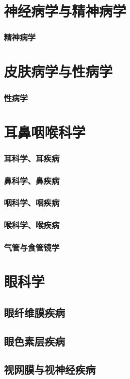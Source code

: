 \documentclass[UTF8]{../ApplicationUniverse}
\begin{document}
\section{神经病学与精神病学}
    \subsubsection{精神病学}
\section{皮肤病学与性病学}
    \subsubsection{性病学}
\section{耳鼻咽喉科学}
    \subsubsection{耳科学、耳疾病}
    \subsubsection{鼻科学、鼻疾病}
    \subsubsection{咽科学、咽疾病}
    \subsubsection{喉科学、喉疾病}
    \subsubsection{气管与食管镜学}
\section{眼科学}
    \subsection{眼纤维膜疾病}
    \subsection{眼色素层疾病}
    \subsection{视网膜与视神经疾病}
\end{document}

